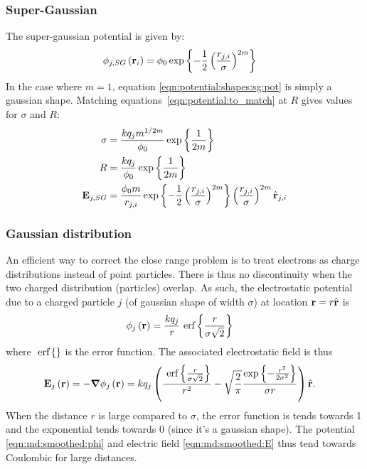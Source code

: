 \subsubsection{Super-Gaussian}

The super-gaussian potential is given by:
\begin{align}
\phi_{j,SG}\left( \textbf{r}_i \right) & = \phi_0 \exp{ \left\{ 
                            -\frac{1}{2} \left( \frac{r_{j,i}}{\sigma} \right)^{2m}
                         \right\}}
\label{eqn:potential:shapes:sg:pot}
\end{align}
In the case where $m = 1$, equation \eqref{eqn:potential:shapes:sg:pot} is simply
a gaussian shape. Matching equations~\eqref{eqn:potential:to_match} at $R$ gives
values for $\sigma$ and $R$:
\begin{subequations}
\begin{align}
\sigma  & = \frac{k q_j m^{1/2m}}{\phi_0} \exp{ \left\{ \frac{1}{2m} \right\}} \\
R       & = \frac{k q_j}{\phi_0} \exp{ \left\{ \frac{1}{2m} \right\}} \\
\textbf{E}_{j,SG} & = \frac{\phi_0 m}{r_{j,i}}
                \exp{ \left\{ -\frac{1}{2} \left( \frac{r_{j,i}}{\sigma} \right)^{2m} \right\}}
                \left(  \frac{r_{j,i}}{\sigma}  \right)^{2m}
                \hat{\textbf{r}}_{j,i}
\end{align}
\label{eqn:potential:shapes:sg}
\end{subequations}





\subsubsection{Gaussian distribution}

An efficient way to correct the close range problem is to treat electrons as
charge distributions instead of point particles. There is thus no
discontinuity when the two charged distribution (particles) overlap. As such,
the electrostatic potential due to a charged particle $j$
(of gaussian shape of width $\sigma$) at location $\textbf{r} = r \hat{\textbf{r}}$ is
\begin{align}
\phi_{j}\left( \textbf{r} \right) & = \frac{k q_j}{r} ~\textrm{erf} \left\{\frac{r}{\sigma \sqrt{2}}\right\}
\label{eqn:md:smoothed:phi}
\end{align}
where $~\textrm{erf} \left\{\right\}$ is the error function. The associated electrostatic field is thus
\begin{align}
\textbf{E}_{j}\left( \textbf{r} \right) & = -\bm{\nabla} \phi_j\left( \textbf{r} \right) = k q_j \left( 
    \frac{ ~\textrm{erf} \left\{\frac{r}{\sigma\sqrt{2}}\right\} }{r^2}
    - \sqrt{\frac{2}{\pi}} \frac{ \exp{ \left\{ -\frac{r^2}{2 \sigma^2} \right\}} }{\sigma r}
 \right) \hat{\textbf{r}}.
\label{eqn:md:smoothed:E}
\end{align}
When the distance $r$ is large compared to $\sigma$, the error function
is tends towards 1 and the exponential tends towards 0 (since it's a gaussian
shape). The potential \eqref{eqn:md:smoothed:phi} and electric field
\eqref{eqn:md:smoothed:E} thus tend towards Coulombic for large distances.

